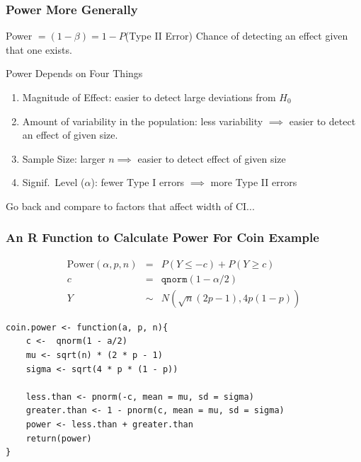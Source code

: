 \documentclass[handout]{beamer}
\begin{document}

\begin{frame}
\frametitle{Power More Generally}
	\begin{block}{Power $ = (1 - \beta) = 1 -  P$(Type II Error)}
Chance of detecting an effect given that one exists.
\end{block}
\begin{block}{Power Depends on Four Things}
	\begin{enumerate}
\item Magnitude of Effect: easier to detect large deviations from $H_0$
\item Amount of variability in the population: less variability $\implies$ easier to detect an effect of given size.
\item Sample Size: larger $n \implies$ easier to detect effect of given size
\item Signif.\ Level ($\alpha$): fewer Type I errors $\implies$ more Type II errors
\end{enumerate}
\end{block}
\alert{Go back and compare to factors that affect width of CI...}
\end{frame}

\begin{frame}[fragile]
\frametitle{An R Function to Calculate Power For Coin Example}
\footnotesize
	\begin{eqnarray*}
		\mbox{Power}(\alpha, p, n) &=& P\left(Y \leq -c\right) + P\left(Y\geq c\right)\\
			 c &=&\texttt{qnorm}(1 - \alpha/2) \\
			 Y &\sim& N\left(\sqrt{n}(2p-1), 4 p(1-p)  \right)
		 \end{eqnarray*} 

\begin{verbatim}
coin.power <- function(a, p, n){
    c <-  qnorm(1 - a/2)	
    mu <- sqrt(n) * (2 * p - 1) 	
    sigma <- sqrt(4 * p * (1 - p))
    
    less.than <- pnorm(-c, mean = mu, sd = sigma)
    greater.than <- 1 - pnorm(c, mean = mu, sd = sigma)
    power <- less.than + greater.than
    return(power)
}
\end{verbatim}
\end{frame}
\end{document}
